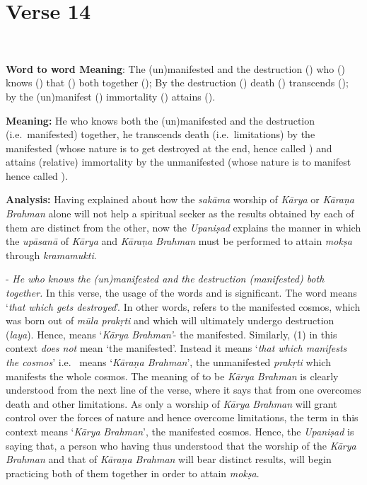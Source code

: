 \chapter{Verse 14}

\begin{moolashloka}
\\
\end{moolashloka}

\textbf{Word to word Meaning}: The (un)manifested and the destruction () who () knows () that () both together (); By the destruction () death () transcends (); by the (un)manifest () immortality () attains ().

\textbf{Meaning:} He who knows both the (un)manifested and the destruction (i.e.\ manifested) together, he transcends death (i.e.\ limitations) by the manifested (whose nature is to get destroyed at the end, hence called ) and attains (relative) immortality by the unmanifested (whose nature is to manifest hence called ).

\textbf{Analysis:} Having explained about how the \emph{sakāma} worship of \emph{Kārya} or \emph{Kāraṇa Brahman} alone will not help a spiritual seeker as the results obtained by each of them are distinct from the other, now the \emph{Upaniṣad} explains the manner in which the \emph{upāsanā} of \emph{Kārya} and \emph{Kāraṇa Brahman} must be performed to attain \emph{mokṣa} through \emph{kramamukti}.

- \emph{He who knows the (un)manifested and the destruction (manifested) both together.} In this verse, the usage of the words  and  is significant. The word  means `\emph{that which gets destroyed}'. In other words,  refers to the manifested cosmos, which was born out of \emph{mūla prakṛti} and which will ultimately undergo destruction (\emph{laya}). Hence,  means `\emph{Kārya} \emph{Brahman'}- the manifested. Similarly,  (1) in this context \emph{does not} mean `the manifested'. Instead it means `\emph{that which manifests the cosmos}' i.e.\  means `\emph{Kāraṇa Brahman}', the unmanifested \emph{prakṛti} which manifests the whole cosmos. The meaning of  to be \emph{Kārya} \emph{Brahman} is clearly understood from the next line of the verse, where it says that from  one overcomes death and other limitations. As only a worship of \emph{Kārya} \emph{Brahman} will grant control over the forces of nature and hence overcome limitations, the term  in this context means `\emph{Kārya} \emph{Brahman}', the manifested cosmos. Hence, the \emph{Upaniṣad} is saying that, a person who having thus understood that the worship of the \emph{Kārya} \emph{Brahman} and that of \emph{Kāraṇa Brahman} will bear distinct results, will begin practicing both of them together in order to attain \emph{mokṣa}.

